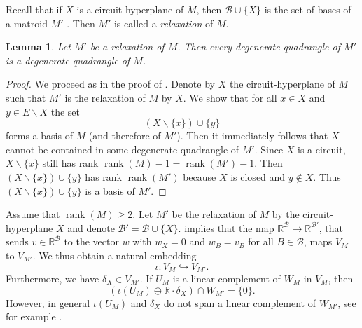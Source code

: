 \documentclass[11pt]{article}
\newtheorem{lem}[theo]{Lemma}
\theoremstyle{definition}
\numberwithin{equation}{section}
\newcommand{\R}{{\mathbb R}}
\newcommand{\cB}{{\mathcal B}}
\newcommand{\rank}{\operatorname{rank}}
\begin{document}
Recall that if $X$ is a circuit-hyperplane of $M$, then $\cB\cup\{X\}$ is the set of bases of a matroid $M'$ \cite[Theorem~1.5.14]{oxley}. Then $M'$ is called a \emph{relaxation} of $M$.

\begin{lem}\label{lem:relax}
    Let $M'$ be a relaxation of $M$. Then every degenerate quadrangle of $M'$ is a degenerate quadrangle of $M$.
\end{lem}

\begin{proof}
    We proceed as in the proof of \cite[Lemma~3.43]{masterleon}.
    Denote by $X$ the circuit-hyperplane of $M$ such that $M'$ is the relaxation of $M$ by $X$.
    We show that for all $x\in X$ and $y\in E\smallsetminus X$ the set
    \[(X\smallsetminus\{x\})\cup\{y\}\]
    forms a basis of $M$ (and therefore of $M'$). Then it immediately follows that $X$ cannot be contained in some degenerate quadrangle of $M'$.
    Since $X$ is a circuit, $X\smallsetminus\{x\}$ still has rank $\rank(M)-1=\rank(M')-1$. Then $(X\smallsetminus\{x\})\cup\{y\}$ has rank $\rank(M')$ because $X$ is closed and $y\notin X$. Thus $(X\smallsetminus\{x\})\cup\{y\}$ is a basis of $M'$.
\end{proof}

\begin{rem}\label{rem:embed}
    Assume that $\rank(M)\geq2$.
    Let $M'$ be the relaxation of $M$ by the circuit-hyperplane $X$ and denote $\cB'=\cB\cup\{X\}$.  implies that the map $\R^{\cB}\to\R^{\cB'}$, that sends $v\in\R^{\cB}$ to the vector $w$ with $w_{X}=0$ and $w_B=v_B$ for all $B\in\cB$, maps $V_M$ to $V_{M'}$. We thus obtain a natural embedding
    \begin{equation*}
        \iota\colon V_M\hookrightarrow V_{M'}.
    \end{equation*}
    Furthermore, we have $\delta_X\in V_{M'}$. If $U_M$ is a linear complement of $W_M$ in $V_M$, then
    \begin{equation*}
        \left(\iota(U_M)\oplus\R\cdot\delta_X\right)\cap W_{M'}=\{0\}.
    \end{equation*}
    However, in general $\iota(U_M)$ and $\delta_X$ do not span a linear complement of $W_{M'}$, see for example \cite[Table~1]{BrandenDLeon}.
\end{rem}
\end{document}
